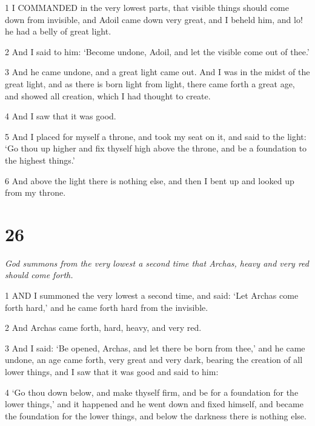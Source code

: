 \par 1 I COMMANDED in the very lowest parts, that visible things should come down from invisible, and Adoil came down very great, and I beheld him, and lo! he had a belly of great light.

\par 2 And I said to him: ‘Become undone, Adoil, and let the visible come out of thee.’

\par 3 And he came undone, and a great light came out. And I was in the midst of the great light, and as there is born light from light, there came forth a great age, and showed all creation, which I had thought to create.

\par 4 And I saw that it was good.

\par 5 And I placed for myself a throne, and took my seat on it, and said to the light: ‘Go thou up higher and fix thyself high above the throne, and be a foundation to the highest things.’

\par 6 And above the light there is nothing else, and then I bent up and looked up from my throne.

\chapter{26}

\par \textit{God summons from the very lowest a second time that Archas, heavy and very red should come forth.}

\par 1 AND I summoned the very lowest a second time, and said: ‘Let Archas come forth hard,’ and he came forth hard from the invisible.

\par 2 And Archas came forth, hard, heavy, and very red.

\par 3 And I said: ‘Be opened, Archas, and let there be born from thee,’ and he came undone, an age came forth, very great and very dark, bearing the creation of all lower things, and I saw that it was good and said to him:

\par 4 ‘Go thou down below, and make thyself firm, and be for a foundation for the lower things,’ and it happened and he went down and fixed himself, and became the foundation for the lower things, and below the darkness there is nothing else.



